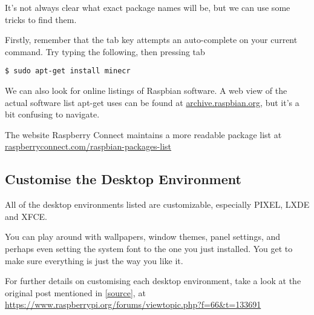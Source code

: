 			It's not always clear what exact package names will be, but we can use some tricks to find them.
			
			Firstly, remember that the tab key attempts an auto-complete on your current command. Try typing the following, then pressing tab
	
	\begin{lstlisting}[style=Terminal]
$ sudo apt-get install minecr
	\end{lstlisting}
	
			We can also look for online listings of Raspbian software. A web view of the actual software list apt-get uses can be found at \mbox{\href{http://archive.raspbian.org/}{archive.raspbian.org}}, but it's a bit confusing to navigate.
			
			The website Raspberry Connect maintains a more readable package list at \mbox{\href{http://www.raspberryconnect.com/raspbian-packages-list}{raspberryconnect.com/raspbian-packages-list}}
	
	\subsection*{Customise the Desktop Environment}

		All of the desktop environments listed are customizable, especially PIXEL, LXDE and XFCE.
		
		You can play around with wallpapers, window themes, panel settings, and perhaps even setting the system font to the one you just installed. You get to make sure everything is just the way you like it.
		
		For further details on customising each desktop environment, take a look at the original post mentioned in \autoref{source}, at \url{https://www.raspberrypi.org/forums/viewtopic.php?f=66&t=133691}